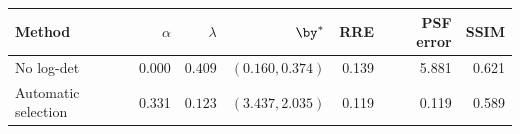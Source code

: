 \begin{tabular}{lrrrrrr}
\toprule
Method & $\alpha$ & $\lambda$ & $\by^*$ & RRE & PSF error & SSIM\\
\midrule
No log-det & 0.000 & $0.409$ & $(0.160,0.374)$ & 0.139 & 5.881 & 0.621 \\
Automatic selection & 0.331 & $0.123$ & $(3.437,2.035)$ & 0.119 & 0.119 & 0.589 \\
\bottomrule
\end{tabular}
